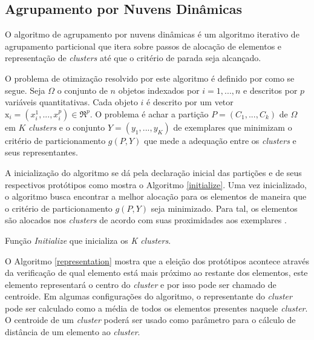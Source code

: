 \subsection{Agrupamento por Nuvens Dinâmicas}

O algoritmo de agrupamento por nuvens dinâmicas é um algoritmo iterativo de agrupamento particional que itera sobre passos de alocação de elementos e representação de \emph{clusters} até que o critério de parada seja alcançado.

O problema de otimização resolvido por este algoritmo é definido por  como se segue. Seja $\Omega$ o conjunto de $n$ objetos indexados por $i = 1, ..., n$ e descritos por $p$ variáveis quantitativas. Cada objeto $i$ é descrito por um vetor $\mathrm{x}_i = (x{^1_i}, ..., x{^p_i}) \in \Re^p$. O problema é achar a partição $P = (C_1, ..., C_k)$ de $\Omega$ em $K$ \emph{clusters} e o conjunto $Y = (y_1, ..., y_K)$ de exemplares que minimizam o critério de particionamento $g(P,Y)$ que mede a adequação entre os \emph{clusters} e seus representantes.

A inicialização do algoritmo se dá pela declaração inicial das partições e de seus respectivos protótipos como mostra o Algoritmo \ref{initialize}. Uma vez inicializado, o algoritmo busca encontrar a melhor alocação para os elementos de maneira que o critério de particionamento $g(P,Y)$ seja minimizado. Para tal, os elementos são alocados nos \emph{clusters} de acordo com suas proximidades aos exemplares \cite{carvalho}.

\begin{algorithm}[htb]
\caption{Função \emph{Initialize} que inicializa os \emph{K clusters}.}
\label{initialize}
	\begin{algorithmic}[1]
		\EndFunction
	\end{algorithmic}
\end{algorithm}

O Algoritmo \ref{representation} mostra que a eleição dos protótipos acontece através da verificação de qual elemento está mais próximo ao restante dos elementos, este elemento representará o centro do \emph{cluster} e por isso pode ser chamado de centroide. Em algumas configurações do algoritmo, o representante do \emph{cluster} pode ser calculado como a média de todos os elementos presentes naquele \emph{cluster}. O centroide de um \emph{cluster} poderá ser usado como parâmetro para o cálculo de distância de um elemento ao \emph{cluster}.

